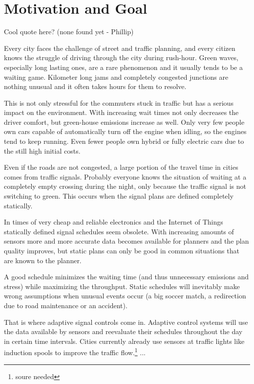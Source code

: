 \section{Motivation and Goal}

Cool quote here? (none found yet - Phillip)

Every city faces the challenge of street and traffic planning, and every citizen knows the struggle of driving through the city during rush-hour. Green waves, especially long lasting ones, are a rare phenomenon and it usually tends to be a waiting game. Kilometer long jams and completely congested junctions are nothing unusual and it often takes hours for them to resolve.

This is not only stressful for the commuters stuck in traffic but has a serious impact on the environment.
With increasing wait times not only decreases the driver comfort, but green-house emissions increase as well. Only very few people own cars capable of automatically turn off the engine when idling, so the engines tend to keep running. Even fewer people own hybrid or fully electric cars due to the still high initial costs.

Even if the roads are not congested, a large portion of the travel time in cities comes from traffic signals. Probably everyone knows the situation of waiting at a completely empty crossing during the night, only because the traffic signal is not switching to green.
This occurs when the signal plans are defined completely statically.

In times of very cheap and reliable electronics and the Internet of Things statically defined signal schedules seem obsolete.
With increasing amounts of sensors more and more accurate data becomes available for planners and the plan quality improves, but static plans can only be good in common situations that are known to the planner.

A good schedule minimizes the waiting time (and thus unnecessary emissions and stress) while maximizing the throughput. Static schedules will inevitably make wrong assumptions when unusual events occur (a big soccer match, a redirection due to road maintenance or an accident).

That is where adaptive signal controls come in. Adaptive control systems will use the data available by sensors and reevaluate their schedules throughout the day in certain time intervals.
Cities currently already use sensors at traffic lights like induction spools to improve the traffic flow.\footnote{soure needed} ...

